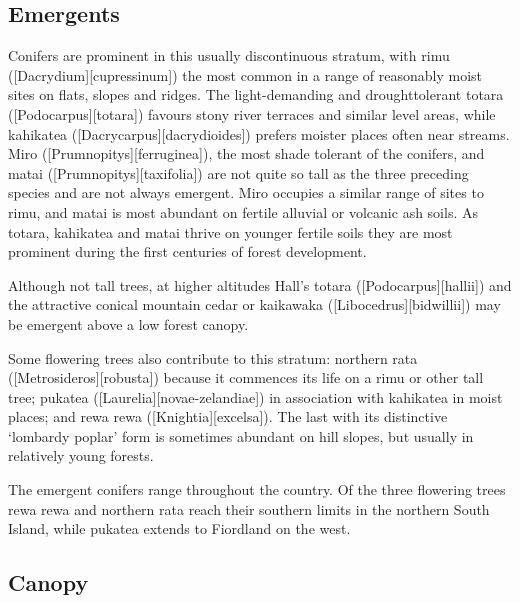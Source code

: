 \subsection{Emergents}

Conifers are prominent in this usually discontinuous stratum, with rimu ([Dacrydium][cupressinum]) the most common in a range of reasonably moist sites on flats, slopes and ridges.
The light-demanding and droughttolerant totara ([Podocarpus][totara]) favours stony river terraces and similar level areas, while kahikatea ([Dacrycarpus][dacrydioides]) prefers moister places often near streams.
Miro ([Prumnopitys][ferruginea]), the most shade tolerant of the conifers, and matai ([Prumnopitys][taxifolia]) are not quite so tall as the three preceding species and are not always emergent.
Miro occupies a similar range of sites to rimu, and matai is most abundant on fertile alluvial or volcanic ash soils.
As totara, kahikatea and matai thrive on younger fertile soils they are most prominent during the first centuries of forest development.

Although not tall trees, at higher altitudes Hall's totara ([Podocarpus][hallii]) and the attractive conical mountain cedar or kaikawaka ([Libocedrus][bidwillii]) may be emergent above a low forest canopy.

Some flowering trees also contribute to this stratum: northern rata ([Metrosideros][robusta]) because it commences its life on a rimu or other tall tree; pukatea ([Laurelia][novae-zelandiae]) in association with kahikatea in moist places; and rewa rewa ([Knightia][excelsa]).
The last with its distinctive `lombardy poplar' form is sometimes abundant on hill slopes, but usually in relatively young forests.

The emergent conifers range throughout the country.
Of the three flowering trees rewa rewa and northern rata reach their southern limits in the northern South Island, while pukatea extends to Fiordland on the west.

\subsection{Canopy}

